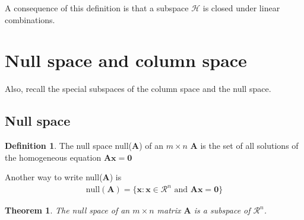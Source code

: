 \documentclass[
]{book}
\newtheorem{theorem}{Theorem}[chapter]
\theoremstyle{definition}
\newtheorem{definition}{Definition}[chapter]
\theoremstyle{definition}
\theoremstyle{definition}
\theoremstyle{definition}
\theoremstyle{remark}
\begin{document}
A consequence of this definition is that a subspace \(\mathcal{H}\) is closed under linear combinations.

\hypertarget{null-space-and-column-space}{%
\section{Null space and column space}\label{null-space-and-column-space}}

Also, recall the special subspaces of the column space and the null space.

\hypertarget{null-space}{%
\subsection{Null space}\label{null-space}}

\begin{definition}
The null space null(\(\mathbf{A}\)) of an \(m \times n\) \(\mathbf{A}\) is the set of all solutions of the homogeneous equation \(\mathbf{A} \mathbf{x} = \mathbf{0}\)

Another way to write null(\(\mathbf{A}\)) is
\[
\begin{aligned}
\mbox{null}(\mathbf{A}) = \{\mathbf{x} : \mathbf{x} \in \mathcal{R}^n \mbox{ and } \mathbf{A} \mathbf{x} = \mathbf{0} \}
\end{aligned}
\]
\end{definition}

\begin{theorem}
The null space of an \(m \times n\) matrix \(\mathbf{A}\) is a subspace of \(\mathcal{R}^n\).
\end{theorem}
\end{document}
